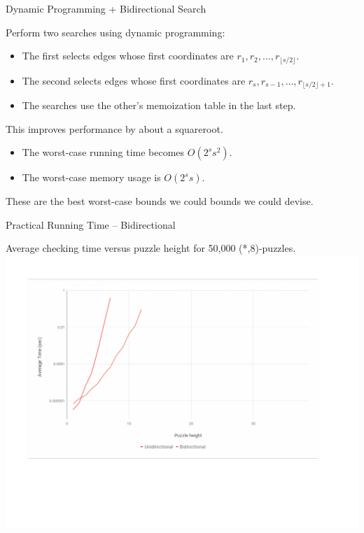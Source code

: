 \documentclass[t,10pt,
mathserif,xcolor=dvipsnames]{beamer}
\begin{document}
\begin{myframe}{Dynamic Programming + Bidirectional Search}

  Perform two searches using dynamic programming:
  \begin{itemize}
  \item The first selects edges whose first coordinates are
    $r_1,r_2,\ldots,r_{\lfloor s/2\rfloor}$.
  \item The second selects edges whose first coordinates are
    $r_s,r_{s-1},\ldots,r_{\lfloor s/2\rfloor+1}$.
  \item The searches use the other's memoization table in the last
    step.
  \end{itemize}

  \bigskip
  
  This improves performance by about a squareroot.
  \begin{itemize}
  \item The worst-case running time becomes $O(2^s s^2)$.
  \item The worst-case memory usage is $O(2^s s)$.
  \end{itemize}

  \bigskip
  
  These are the best worst-case bounds we could bounds we could devise.
  
  
\end{myframe}

\begin{myframe}{Practical Running Time -- Bidirectional}

  Average checking time versus puzzle height for 50,000 (*,8)-puzzles.
  \hspace*{-9ex}\includegraphics[width=1.28\linewidth, trim={.5in 2in 1in 1in}, clip]{figs/plotbi.pdf}
 
\end{myframe}
\end{document}
